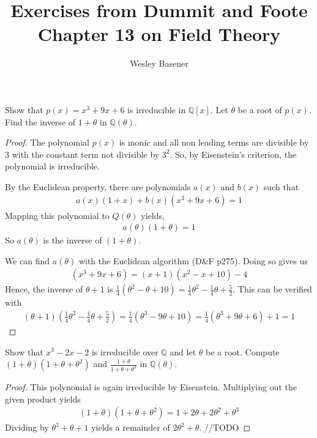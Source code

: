 \documentclass[10pt]{article}
\newcommand{\Q}{\mathbb{Q}}
\newenvironment{problem}[2][Problem]{\begin{trivlist}
		\item[\hskip \labelsep {\bfseries #1}\hskip \labelsep {\bfseries #2.}]}{\end{trivlist}}
\begin{document}
	
	\title{Exercises from Dummit and Foote Chapter 13 on Field Theory}
	\author{Wesley Basener}
	\maketitle
	\begin{problem}{1.1}
		Show that $p(x) = x^3 + 9x +6$ is irreducible in $\Q[x]$. Let $\theta$ be a root of $p(x)$. Find the inverse of $1 + \theta$ in $\Q(\theta)$.
		\begin{proof}
			The polynomial $p(x)$ is monic and all non leading terms are divisible by $3$ with the constant term not divisible by $3^2$. So, by Eisenstein's criterion, the polynomial is irreducible.
			
			By the Euclidean property, there are polynomials $a(x)$ and $b(x)$ such that
			\begin{align*}
				a(x)(1+x) + b(x)(x^3 + 9x + 6) = 1
			\end{align*}
			Mapping this polynomial to $Q(\theta)$ yields,
			\begin{align*}
				a(\theta)(1+\theta) = 1
			\end{align*}
			So $a(\theta)$ is the inverse of $(1+\theta)$.
			
			We can find $a(\theta)$ with the Euclidean algorithm (D\&F p275). Doing so gives us
			\begin{align*}
				(x^3 + 9x + 6) = (x+1)(x^2-x+10) - 4
			\end{align*}
			Hence, the inverse of $\theta + 1$ is $\frac{1}{4}(\theta^2-\theta+10) = \frac{1}{4}\theta^2-\frac{1}{4}\theta+\frac{5}{2}$. This can be verified with
			\begin{align*}
				(\theta + 1)(\frac{1}{4}\theta^2-\frac{1}{4}\theta+\frac{5}{2}) = \frac{1}{4}(\theta^3 - 9\theta + 10) = \frac{1}{4}(\theta^3 + 9\theta + 6) + 1 = 1 
			\end{align*}
		\end{proof}
	\end{problem}
	
	\begin{problem}{1.2}
		Show that $x^3 -2x -2$ is irreducible over $\Q$ and let $\theta$ be a root. Compute $(1+\theta)(1+\theta+\theta^2)$ and $\frac{1+\theta}{1+\theta+\theta^2}$ in $\Q(\theta)$.
		\begin{proof}
			This polynomial is again irreducible by Eisenstein. Multiplying out the given product yields
			\begin{align*}
				(1+\theta)(1+\theta+\theta^2) = 1 + 2\theta +2\theta^2 + \theta^3
			\end{align*}
			Dividing by $\theta^3 + \theta + 1$ yields a remainder of $2\theta^2+\theta$.
			//TODO
		\end{proof}
	\end{problem}
	
\end{document}

